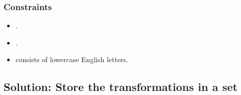 \documentclass[letterpaper,12pt,english]{book}
\begin{document}
\subsubsection{Constraints}
\label{\detokenize{String/08_STR_804_Unique_Morse_Code_Words:constraints}}\begin{itemize}
\item {} 
\sphinxAtStartPar
{}.

\item {} 
\sphinxAtStartPar
{}.

\item {} 
\sphinxAtStartPar
{} consists of lowercase English letters.

\end{itemize}


\subsection{Solution: Store the transformations in a set}
\label{\detokenize{String/08_STR_804_Unique_Morse_Code_Words:solution-store-the-transformations-in-a-set}}
\end{document}
